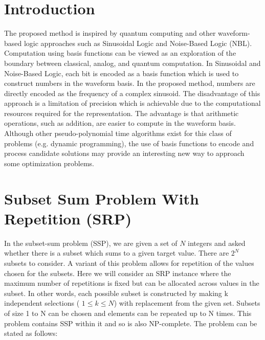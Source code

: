 \documentclass[reqno]{amsart}
\theoremstyle{definition}
\theoremstyle{remark}
\begin{document}



\section{Introduction}
\noindent
The proposed method is inspired by quantum computing and other waveform-based logic approaches such as Sinusoidal Logic and Noise-Based Logic (NBL). Computation using basis functions can be viewed as an exploration of the boundary between classical, analog, and quantum computation. In Sinusoidal and Noise-Based Logic, each bit is encoded as a basis function which is used to construct numbers in the waveform basis. In the proposed method, numbers are directly encoded as the frequency of a complex sinusoid. The disadvantage of this approach is a limitation of precision which is achievable due to the computational resources required for the representation. The advantage is that arithmetic operations, such as addition, are easier to compute in the waveform basis. Although other pseudo-polynomial time algorithms exist for this class of problems (e.g. dynamic programming), the use of basis functions to encode and process candidate solutions may provide an interesting new way to approach some optimization problems.

\section{Subset Sum Problem With Repetition (SRP) }
In the subset-sum problem (SSP), we are given a set of $N$ integers and asked whether there is a subset which sums to a given target value. There are $2^N$ subsets to consider. A variant of this problem allows for repetition of the values chosen for the subsets. Here we will consider an SRP instance where the maximum number of repetitions is fixed but can be allocated across values in the subset. In other words, each possible subset is constructed by making k independent selections ( $ 1 \leq k \leq N$) with replacement from the given set. Subsets of size 1 to N can be chosen and elements can be repeated up to N times. This problem contains SSP within it and so is also NP-complete. The problem can be stated as follows:
\end{document}
